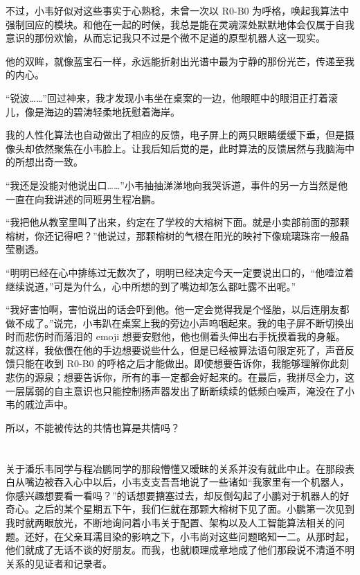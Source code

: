 \documentclass[punct=kaiming, zihao=5, openany, fontset=sikou]{ctexbook}
\begin{document}
不过，小韦好似对这些事实于心熟稔，未曾一次以 R0-B0 为呼格，唤起我算法中强制回应的模块。和他在一起的时候，我总是能在灵魂深处默默地体会仅属于自我意识的那份欢愉，从而忘记我只不过是个微不足道的原型机器人这一现实。

他的双眸，就像蓝宝石一样，永远能折射出光谱中最为宁静的那份光芒，传递至我的内心。

“锐波……”回过神来，我才发现小韦坐在桌案的一边，他眼眶中的眼泪正打着滚儿，像是海边的碧涛轻柔地抚慰着海岸。

我的人性化算法也自动做出了相应的反馈，电子屏上的两只眼睛缓缓下垂，但是摄像头却依然聚焦在小韦脸上。让我后知后觉的是，此时算法的反馈居然与我脑海中的所想出奇一致。

“我还是没能对他说出口……”小韦抽抽涕涕地向我哭诉道，事件的另一方当然是他一直在向我讲述的同班男生程冶鹏。

“我把他从教室里叫了出来，约定在了学校的大榕树下面。就是小卖部前面的那颗榕树，你还记得吧？”他说过，那颗榕树的气根在阳光的映衬下像琉璃珠帘一般晶莹剔透。

“明明已经在心中排练过无数次了，明明已经决定今天一定要说出口的，“他噎泣着继续说道，”可是为什么，心中所想的到了嘴边却怎么都吐露不出呢。”

“我好害怕啊，害怕说出的话会吓到他。他一定会觉得我是个怪胎，以后连朋友都做不成了。”说完，小韦趴在桌案上我的旁边小声呜咽起来。我的电子屏不断切换出时而悲伤时而落泪的 emoji 想要安慰他，他也侧着头伸出右手抚摸着我的身躯。就这样，我依偎在他的手边想要说些什么，但是已经被算法语句限定死了，声音反馈只能在收到 R0-B0 的呼格之后才能做出。即使想要告诉你，我能够理解你此刻悲伤的源泉；想要告诉你，所有的事一定都会好起来的。在最后，我拼尽全力，这一层孱弱的自主意识也只能控制扬声器发出了断断续续的低频白噪声，淹没在了小韦的戚泣声中。

所以，不能被传达的共情也算是共情吗？

\section{}

关于潘乐韦同学与程冶鹏同学的那段懵懂又暧昧的关系并没有就此中止。在那段表白从嘴边被吞入心中以后，小韦支支吾吾地说了一些诸如“我家里有一个机器人，你感兴趣想要看一看吗？”的话想要搪塞过去，却反倒勾起了小鹏对于机器人的好奇心。之后的某个星期五下午，我们仨就在那颗大榕树下见了面。小鹏第一次见到我时就两眼放光，不断地询问着小韦关于配置、架构以及人工智能算法相关的问题。还好，在父亲耳濡目染的影响之下，小韦尚对这些问题略知一二。从那时起，他们就成了无话不谈的好朋友。而我，也就顺理成章地成了他们那段说不清道不明关系的见证者和记录者。
\end{document}
